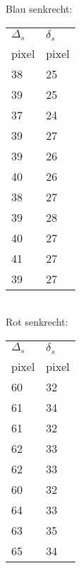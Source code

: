 \newpage
Blau senkrecht:\\
\begin{tabular}[h]{l|l}
    $\Delta_s$ & $\delta_s$ \\
    pixel & pixel \\
    \hline
    38 & 25 \\
    39 & 25 \\
    37 & 24 \\
    39 & 27 \\
    39 & 26 \\
    40 & 26 \\
    38 & 27 \\
    39 & 28 \\
    40 & 27 \\
    41 & 27 \\
    39 & 27 \\
\end{tabular}\\
\vspace{2cm}
Rot senkrecht:\\
\begin{tabular}[h]{l|l}
    $\Delta_s$ & $\delta_s$ \\
    pixel & pixel \\
    \hline
    60 & 32 \\
    61 & 34 \\
    61 & 32 \\
    62 & 33 \\
    62 & 33 \\
    60 & 32 \\
    64 & 33 \\
    63 & 35 \\
    65 & 34 \\
\end{tabular}